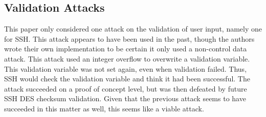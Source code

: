 \documentclass{article}
\begin{document}
\subsection{Validation Attacks}
This paper only considered one attack on the validation of user input,
namely one for SSH.
This attack appears to have been used in the past,
though the authors wrote their own implementation to be certain it only used a non-control data attack.
This attack used an integer overflow to overwrite a validation variable.
This validation variable was not set again, even when validation failed.
Thus, SSH would check the validation variable and think it had been successful.
The attack succeeded on a proof of concept level,
but was then defeated by future SSH DES checksum validation.
Given that the previous attack seems to have succeeded in this matter as well,
this seems like a viable attack.
\end{document}
